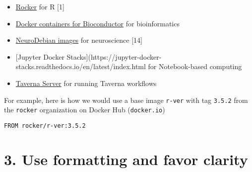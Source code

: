 \documentclass[10pt,letterpaper]{article}
\providecommand{\tightlist}{%
  \setlength{\itemsep}{0pt}\setlength{\parskip}{0pt}}
\begin{document}
\begin{itemize}
\tightlist
\item
  \href{https://www.rocker-project.org/}{Rocker} for R {[}1{]}
\item
  \href{https://bioconductor.org/help/docker/}{Docker containers for
  Bioconductor} for bioinformatics
\item
  \href{https://hub.docker.com/_/neurodebian}{NeuroDebian images} for
  neuroscience {[}14{]}
\item
  {[}Jupyter Docker
  Stacks{]}(https://jupyter-docker-stacks.readthedocs.io/en/latest/index.html
  for Notebook-based computing
\item
  \href{https://hub.docker.com/r/taverna/taverna-server}{Taverna Server}
  for running Taverna workflows
\end{itemize}

For example, here is how we would use a base image \texttt{r-ver} with
tag \texttt{3.5.2} from the \texttt{rocker} organization on Docker Hub
(\texttt{docker.io})

\begin{verbatim}
FROM rocker/r-ver:3.5.2
\end{verbatim}

\hypertarget{use-formatting-and-favor-clarity}{%
\section{3. Use formatting and favor
clarity}\label{use-formatting-and-favor-clarity}}
\end{document}
